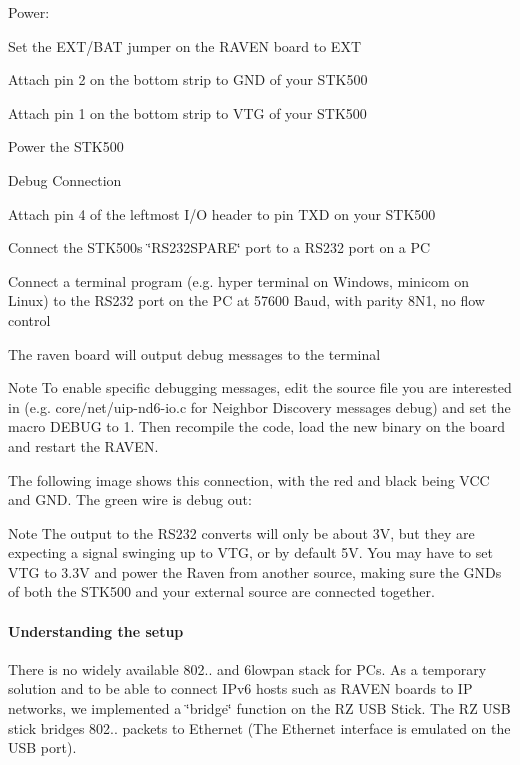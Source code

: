 Power\+: \begin{DoxyItemize}
\item Set the \textquotesingle{}E\+X\+T/\+B\+AT\textquotesingle{} jumper on the R\+A\+V\+EN board to E\+XT \item Attach pin 2 on the bottom strip to G\+ND of your S\+T\+K500 \item Attach pin 1 on the bottom strip to V\+TG of your S\+T\+K500 \item Power the S\+T\+K500\end{DoxyItemize}
Debug Connection \begin{DoxyItemize}
\item Attach pin 4 of the leftmost I/O header to pin \textquotesingle{}T\+XD\textquotesingle{} on your S\+T\+K500 \item Connect the S\+T\+K500\textquotesingle{}s \char`\"{}\+R\+S232\+S\+P\+A\+R\+E\char`\"{} port to a R\+S232 port on a PC \item Connect a terminal program (e.\+g. hyper terminal on Windows, minicom on Linux) to the R\+S232 port on the PC at 57600 Baud, with parity 8\+N1, no flow control \item The raven board will output debug messages to the terminal\end{DoxyItemize}
\begin{DoxyNote}{Note}
To enable specific debugging messages, edit the source file you are interested in (e.\+g. core/net/uip-\/nd6-\/io.\+c for Neighbor Discovery messages debug) and set the macro D\+E\+B\+UG to 1. Then recompile the code, load the new binary on the board and restart the R\+A\+V\+EN.
\end{DoxyNote}
The following image shows this connection, with the red and black being V\+CC and G\+ND. The green wire is debug out\+:



\begin{DoxyNote}{Note}
The output to the R\+S232 converts will only be about 3V, but they are expecting a signal swinging up to V\+TG, or by default 5V. You may have to set V\+TG to 3.\+3V and power the Raven from another source, making sure the G\+N\+Ds of both the S\+T\+K500 and your external source are connected together.
\end{DoxyNote}
\hypertarget{a00072_advanced_details}{}\paragraph{Understanding the setup}\label{a00072_advanced_details}
There is no widely available 802.. and 6lowpan stack for P\+Cs. As a temporary solution and to be able to connect I\+Pv6 hosts such as R\+A\+V\+EN boards to IP networks, we implemented a \char`\"{}bridge\char`\"{} function on the RZ U\+SB Stick. The RZ U\+SB stick bridges 802.. packets to Ethernet (The Ethernet interface is emulated on the U\+SB port).

